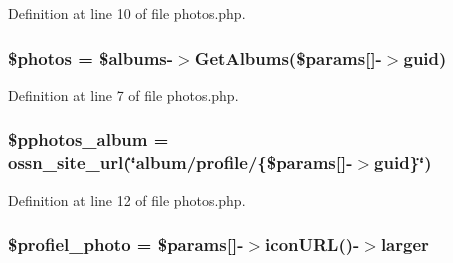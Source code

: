 Definition at line 10 of file photos.\+php.

\subsubsection[{\texorpdfstring{\$photos}{$photos}}]{\setlength{\rightskip}{0pt plus 5cm}\$photos = \$albums-\/$>$Get\+Albums(\$params\mbox{[}\textquotesingle{}\mbox{]}-\/$>$guid)}\hypertarget{photos_2pages_2photos_8php_a7d16539c7a3688bee1d3184c81c47487}{}\label{photos_2pages_2photos_8php_a7d16539c7a3688bee1d3184c81c47487}


Definition at line 7 of file photos.\+php.

\subsubsection[{\texorpdfstring{\$pphotos\+\_\+album}{$pphotos_album}}]{\setlength{\rightskip}{0pt plus 5cm}\$pphotos\+\_\+album = {\bf ossn\+\_\+site\+\_\+url}(\char`\"{}album/profile/\{\$params\mbox{[}\textquotesingle{}\mbox{]}-\/$>$guid\}\char`\"{})}\hypertarget{photos_2pages_2photos_8php_aadcb75bc0a6a2c89cf7d0fbe5a660c00}{}\label{photos_2pages_2photos_8php_aadcb75bc0a6a2c89cf7d0fbe5a660c00}


Definition at line 12 of file photos.\+php.

\subsubsection[{\texorpdfstring{\$profiel\+\_\+photo}{$profiel_photo}}]{\setlength{\rightskip}{0pt plus 5cm}\$profiel\+\_\+photo = \$params\mbox{[}\textquotesingle{}\mbox{]}-\/$>$icon\+U\+RL()-\/$>$larger}\hypertarget{photos_2pages_2photos_8php_aab0bf08a0d7766d0c7ca7afe29e54d13}{}\label{photos_2pages_2photos_8php_aab0bf08a0d7766d0c7ca7afe29e54d13}


